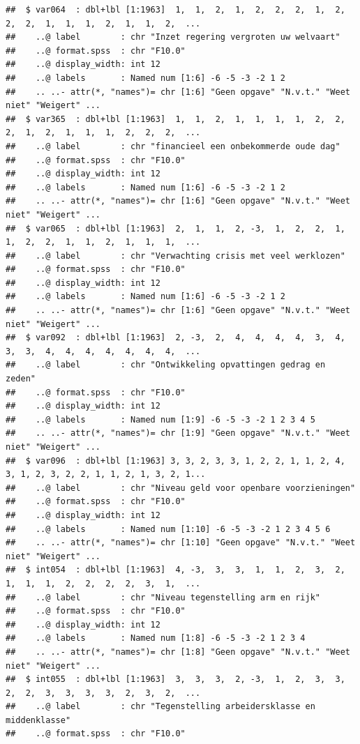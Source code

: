 \documentclass[
]{book}
\begin{document}
\begin{verbatim}
##  $ var064  : dbl+lbl [1:1963]  1,  1,  2,  1,  2,  2,  2,  1,  2,  2,  2,  1,  1,  1,  2,  1,  1,  2,  ...
##    ..@ label        : chr "Inzet regering vergroten uw welvaart"
##    ..@ format.spss  : chr "F10.0"
##    ..@ display_width: int 12
##    ..@ labels       : Named num [1:6] -6 -5 -3 -2 1 2
##    .. ..- attr(*, "names")= chr [1:6] "Geen opgave" "N.v.t." "Weet niet" "Weigert" ...
##  $ var365  : dbl+lbl [1:1963]  1,  1,  2,  1,  1,  1,  1,  2,  2,  2,  1,  2,  1,  1,  1,  2,  2,  2,  ...
##    ..@ label        : chr "financieel een onbekommerde oude dag"
##    ..@ format.spss  : chr "F10.0"
##    ..@ display_width: int 12
##    ..@ labels       : Named num [1:6] -6 -5 -3 -2 1 2
##    .. ..- attr(*, "names")= chr [1:6] "Geen opgave" "N.v.t." "Weet niet" "Weigert" ...
##  $ var065  : dbl+lbl [1:1963]  2,  1,  1,  2, -3,  1,  2,  2,  1,  1,  2,  2,  1,  1,  2,  1,  1,  1,  ...
##    ..@ label        : chr "Verwachting crisis met veel werklozen"
##    ..@ format.spss  : chr "F10.0"
##    ..@ display_width: int 12
##    ..@ labels       : Named num [1:6] -6 -5 -3 -2 1 2
##    .. ..- attr(*, "names")= chr [1:6] "Geen opgave" "N.v.t." "Weet niet" "Weigert" ...
##  $ var092  : dbl+lbl [1:1963]  2, -3,  2,  4,  4,  4,  4,  3,  4,  3,  3,  4,  4,  4,  4,  4,  4,  4,  ...
##    ..@ label        : chr "Ontwikkeling opvattingen gedrag en zeden"
##    ..@ format.spss  : chr "F10.0"
##    ..@ display_width: int 12
##    ..@ labels       : Named num [1:9] -6 -5 -3 -2 1 2 3 4 5
##    .. ..- attr(*, "names")= chr [1:9] "Geen opgave" "N.v.t." "Weet niet" "Weigert" ...
##  $ var096  : dbl+lbl [1:1963] 3, 3, 2, 3, 3, 1, 2, 2, 1, 1, 2, 4, 3, 1, 2, 3, 2, 2, 1, 1, 2, 1, 3, 2, 1...
##    ..@ label        : chr "Niveau geld voor openbare voorzieningen"
##    ..@ format.spss  : chr "F10.0"
##    ..@ display_width: int 12
##    ..@ labels       : Named num [1:10] -6 -5 -3 -2 1 2 3 4 5 6
##    .. ..- attr(*, "names")= chr [1:10] "Geen opgave" "N.v.t." "Weet niet" "Weigert" ...
##  $ int054  : dbl+lbl [1:1963]  4, -3,  3,  3,  1,  1,  2,  3,  2,  1,  1,  1,  2,  2,  2,  2,  3,  1,  ...
##    ..@ label        : chr "Niveau tegenstelling arm en rijk"
##    ..@ format.spss  : chr "F10.0"
##    ..@ display_width: int 12
##    ..@ labels       : Named num [1:8] -6 -5 -3 -2 1 2 3 4
##    .. ..- attr(*, "names")= chr [1:8] "Geen opgave" "N.v.t." "Weet niet" "Weigert" ...
##  $ int055  : dbl+lbl [1:1963]  3,  3,  3,  2, -3,  1,  2,  3,  3,  2,  2,  3,  3,  3,  3,  2,  3,  2,  ...
##    ..@ label        : chr "Tegenstelling arbeidersklasse en middenklasse"
##    ..@ format.spss  : chr "F10.0"

\end{verbatim}
\end{document}
